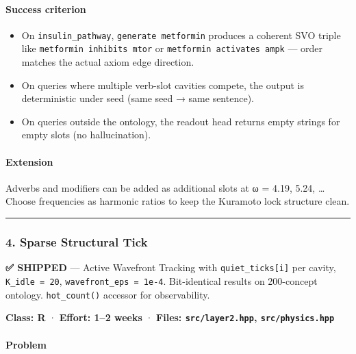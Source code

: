 \documentclass[
  11pt,
  a4paper,
]{article}
\providecommand{\tightlist}{%
  \setlength{\itemsep}{0pt}\setlength{\parskip}{0pt}}
\begin{document}
\paragraph{Success criterion}\label{success-criterion-2}

\begin{itemize}
\tightlist
\item
  On \texttt{insulin\_pathway}, \texttt{generate\ metformin} produces a
  coherent SVO triple like \texttt{metformin\ inhibits\ mtor} or
  \texttt{metformin\ activates\ ampk} --- order matches the actual axiom
  edge direction.
\item
  On queries where multiple verb-slot cavities compete, the output is
  deterministic under seed (same seed → same sentence).
\item
  On queries outside the ontology, the readout head returns empty
  strings for empty slots (no hallucination).
\end{itemize}

\paragraph{Extension}\label{extension}

Adverbs and modifiers can be added as additional slots at ω = 4.19,
5.24, \ldots{} Choose frequencies as harmonic ratios to keep the
Kuramoto lock structure clean.

\begin{center}\rule{0.5\linewidth}{0.5pt}\end{center}

\subsubsection{4. Sparse Structural Tick}\label{sparse-structural-tick}

\textbf{✅ SHIPPED} --- Active Wavefront Tracking with
\texttt{quiet\_ticks{[}i{]}} per cavity, \texttt{K\_idle\ =\ 20},
\texttt{wavefront\_eps\ =\ 1e-4}. Bit-identical results on 200-concept
ontology. \texttt{hot\_count()} accessor for observability.

\textbf{Class: R} · \textbf{Effort: 1--2 weeks} · \textbf{Files:
\texttt{src/layer2.hpp}, \texttt{src/physics.hpp}}

\paragraph{Problem}\label{problem-3}
\end{document}

